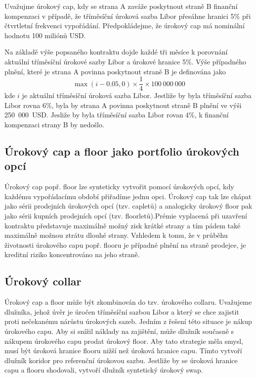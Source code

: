 \documentclass[a4paper]{book}
\begin{document}
Uvažujme úrokový cap, kdy se strana A zaváže poskytnout straně B finanční kompenzaci v případě, že tříměsíční úroková sazba Libor přesáhne hranici 5\% při čtvrtletní frekvenci vypořádání. Předpokládejme, že úrokový cap má nominální hodnotu 100 miliónů USD.

Na základě výše popsaného kontraktu dojde každé tři měsíce k porovnání aktuální tříměsíční úrokové sazby Libor a úrokové hranice 5\%. Výše případného plnění, které je strana A povinna poskytnout straně B je definována jako
\begin{equation*}
\max(i - 0.05, 0) \times \frac{1}{4} \times 100~000~000
\end{equation*}
kde $i$ je aktuální tříměsíční úroková sazba Libor. Jestliže by byla tříměsíční sazba Libor rovna 6\%, byla by strana A povinna poskytnout straně B plnění ve výši 250~000~USD. Jesliže by byla tříměsíční sazba Libor rovan 4\%, k finanční kompenzaci strany B by nedošlo.

\subsection{Úrokový cap a floor jako portfolio úrokových opcí}

Úrokový cap popř. floor lze synteticky vytvořit pomocí úrokových opcí, kdy každému vypořádacímu období přiřadíme jednu opci. Úrokový cap tak lze chápat jako sérii prodejních úrokových opcí (tzv. capletů) a analogicky úrokový floor pak jako sérii kupních prodejních opcí (tzv. floorletů).Prémie vyplacená při uzavření kontraktu představuje maximálně možný zisk krátké strany a tím pádem také maximálně možnou ztrátu dlouhé strany. Vzhledem k tomu, že v průběhu životnosti úrokového capu popř. flooru je případné plnění na straně prodejce, je kreditní riziko koncentrováno na jeho straně.

\subsection{Úrokový collar}

Úrokový cap a floor může být zkombinován do tzv. úrokového collaru. Uvažujeme dlužníka, jehož úvěr je úročen tříměsíční sazbou Libor a který se chce zajistit proti nečekanému nárůstu úrokových sazeb. Jedním z řešení této situace je nákup úrokového capu. Aby si snížil náklady na zajištění, může dlužník současně s nákupem úrokového capu prodat úrokový floor. Aby tato strategie měla smysl, musí být úroková hranice flooru nižší než úroková hranice capu. Tímto vytvoří dlužník koridor pro referenční úrokovou sazbu. Jestliže by se úroková hranice capu a flooru shodovali, vytvoří dlužník syntetický úrokový swap.
\end{document}
